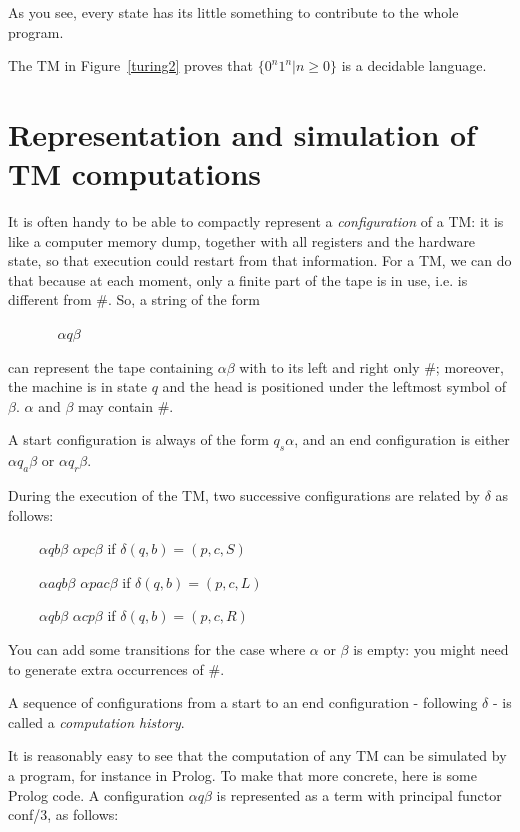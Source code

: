 As you see, every state has its little something to contribute to the
whole program.


The TM in Figure~\ref{turing2} proves that
%
$\{0^n1^n|n \geq 0\}$ is a decidable language.


\section{Representation and simulation of TM computations}

It is often handy to be able to compactly represent a {\em
  configuration} of a TM: it is like a computer memory dump, together
with all registers and the hardware state, so that execution could
restart from that information. For a TM, we can do that because at
each moment, only a finite part of the tape is in use, i.e. is
different from \#. So, a string of the form

$~~~~~~~~~~~~~~~~\alpha q \beta$

can represent the tape containing $\alpha\beta$ with to its left and
right only \#; moreover, the machine is in state $q$ and the head is
positioned under the leftmost symbol of $\beta$. $\alpha$ and $\beta$
may contain \#.

A start configuration is always of the form $q_s\alpha$, and an end
configuration is either $\alpha q_a \beta$ or $\alpha q_r \beta$.

During the execution of the TM, two successive configurations are
related by $\delta$ as follows:


$~~~~~~~~~~\alpha q b \beta$ \rpijl $\alpha p c \beta$ if $\delta(q,b) = (p,c,S)$

$~~~~~~~~~~\alpha a q b \beta$ \rpijl $\alpha p a c \beta$ if $\delta(q,b) = (p,c,L)$

$~~~~~~~~~~\alpha q b \beta$ \rpijl $\alpha c p \beta$ if $\delta(q,b) = (p,c,R)$

You can add some transitions for the case where $\alpha$ or $\beta$ is
empty: you might need to generate extra occurrences of \#.


A sequence of configurations from a start to an end configuration -
following $\delta$ - is called a {\em computation history}.

It is reasonably easy to see that the computation of any TM can be
simulated by a program, for instance in Prolog. To make that more
concrete, here is some Prolog code. A configuration $\alpha q \beta$
is represented as a term with principal functor conf/3, as follows:

